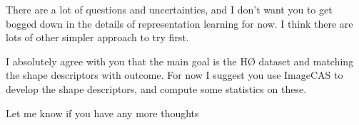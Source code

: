 There are a lot of questions and uncertainties, and I don't want you to get bogged down in the details of representation learning for now. I think there are lots of other simpler approach to try first. 

I absolutely agree with you that the main goal is the HØ dataset and matching the shape descriptors with outcome. For now I suggest you use ImageCAS to develop the shape descriptors, and compute some statistics on these. 

Let me know if you have any more thoughts 🙂
